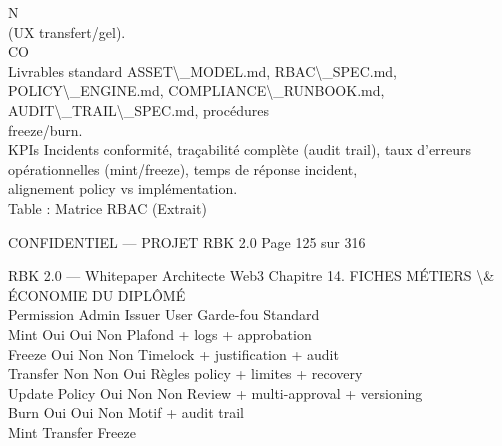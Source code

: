 \documentclass[12pt,landscape,a4paper]{article}
\newenvironment{confidential}
{\begin{tcolorbox}[
    colback=rbkred!5!white,
    colframe=rbkred!75!black,
    title=CONFIDENTIEL,
    fonttitle=\bfseries\color{white},
    coltitle=rbkred!75!black,
    breakable,
    enhanced,
    frame hidden,
    borderline west={2pt}{0pt}{rbkred!75!black}
]}
{\end{tcolorbox}}
\begin{document}
\vspace{0.5em}
\vspace{0.5em}
N\\
(UX transfert/gel).\\
CO\\
Livrables standard    ASSET\textbackslash{}_MODEL.md, RBAC\textbackslash{}_SPEC.md, POLICY\textbackslash{}_ENGINE.md, COMPLIANCE\textbackslash{}_RUNBOOK.md, AUDIT\textbackslash{}_TRAIL\textbackslash{}_SPEC.md, procédures\\
freeze/burn.\\
\vspace{0.5em}
KPIs Incidents conformité, traçabilité complète (audit trail), taux d’erreurs opérationnelles (mint/freeze), temps de réponse incident,\\
alignement policy vs implémentation.\\
\vspace{0.5em}
Table : Matrice RBAC (Extrait)\\
\vspace{0.5em}
\vspace{0.5em}
\vspace{0.5em}
\vspace{0.5em}
\begin{confidential}CONFIDENTIEL — PROJET RBK 2.0                                 Page 125 sur 316\end{confidential}
RBK 2.0 — Whitepaper Architecte Web3                                                  Chapitre 14. FICHES MÉTIERS \textbackslash{}& ÉCONOMIE DU DIPLÔMÉ\\
\vspace{0.5em}
\vspace{0.5em}
Permission   Admin Issuer User Garde-fou Standard\\
Mint          Oui    Oui Non Plafond + logs + approbation\\
Freeze        Oui   Non Non Timelock + justification + audit\\
Transfer      Non   Non Oui Règles policy + limites + recovery\\
Update Policy Oui   Non Non Review + multi-approval + versioning\\
Burn          Oui    Oui Non Motif + audit trail\\
\vspace{0.5em}
\vspace{0.5em}
\vspace{0.5em}
Mint           Transfer          Freeze\\
\vspace{0.5em}
\end{document}
